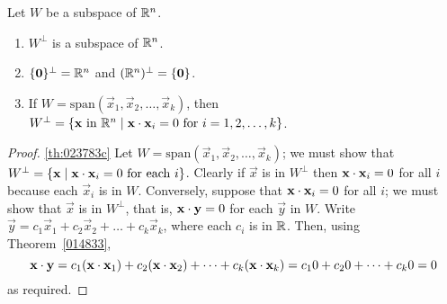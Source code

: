 \documentclass{ximera}
\begin{document}
\begin{theorem}\label{th:023783}
Let $W$ be a subspace of $\mathbb{R}^n$.
\begin{enumerate}
\item\label{th:023783a} $W^\perp$ is a subspace of $\mathbb{R}^n$.

\item\label{th:023783b} $\{\mathbf{0}\}^\perp = \mathbb{R}^n$ and $(\mathbb{R}^n)^\perp = \{\mathbf{0}\}$.

\item\label{th:023783c} If $W = \mbox{span}\left(\vec{x}_{1}, \vec{x}_{2}, \dots, \vec{x}_{k}\right)$, then $W^\perp = \{\mathbf{x} \mbox{ in } \mathbb{R}^n \mid \mathbf{x} \cdot \mathbf{x}_{i} = 0 \mbox{ for } i = 1, 2, \dots, k\}$.

\end{enumerate}
\end{theorem}

\begin{proof}
\ref{th:023783c} Let $W = \mbox{span}\left(\vec{x}_{1}, \vec{x}_{2}, \dots, \vec{x}_{k}\right)$; we must show that $W^\perp = \{\mathbf{x} \mid \mathbf{x} \cdot \mathbf{x}_{i} = 0 \mbox{ for each } i\}$. Clearly if $\vec{x}$ is in $W^\perp$ then $\mathbf{x} \cdot \mathbf{x}_{i} = 0$ for all $i$ because each $\vec{x}_{i}$ is in $W$. Conversely, suppose that $\mathbf{x} \cdot \mathbf{x}_{i} = 0$ for all $i$; we must show that $\vec{x}$ is in $W^\perp$, that is, $\mathbf{x} \cdot \mathbf{y} = 0$ for each $\vec{y}$ in $W$. Write $\vec{y} = c_{1}\vec{x}_{1} + c_{2}\vec{x}_{2} + \dots  + c_{k}\vec{x}_{k}$, where each $c_{i}$ is in $\mathbb{R}$. Then, using Theorem~\ref{014833},
\begin{equation*}
\mathbf{x} \cdot \mathbf{y} = c_{1}(\mathbf{x} \cdot \mathbf{x}_{1}) + c_{2}(\mathbf{x} \cdot \mathbf{x}_{2})+ \dots +c_{k}(\mathbf{x} \cdot \mathbf{x}_{k}) = c_{1}0 + c_{2}0 + \dots + c_{k}0 = 0
\end{equation*}
 as required.

\end{proof}
\end{document}

